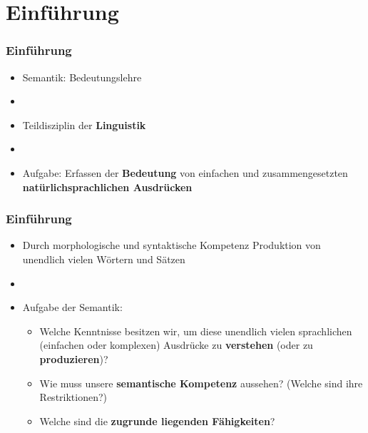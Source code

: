 %
\section{Einführung}
%

\begin{frame}
\frametitle{Einführung}

\begin{itemize}
	\item Semantik: Bedeutungslehre
	\item []
	\item Teildisziplin der \textbf{Linguistik} 
	\item[]
	\item Aufgabe: Erfassen der \textbf{Bedeutung} von einfachen und zusammengesetzten \textbf{natürlichsprachlichen Ausdrücken} 

\end{itemize}

\end{frame}


\begin{frame}
	\frametitle{Einführung}

\begin{itemize}
	\item Durch morphologische und syntaktische Kompetenz \ras Produktion von unendlich vielen Wörtern und Sätzen
	\item[]
	\item Aufgabe der Semantik: 
	
	\begin{itemize}
		\item Welche Kenntnisse besitzen wir, um diese unendlich vielen sprachlichen (einfachen oder komplexen) Ausdrücke zu \textbf{verstehen} (oder zu \textbf{produzieren})?
		
		\item Wie muss unsere \textbf{semantische Kompetenz} aussehen? (Welche sind ihre Restriktionen?)
		
		\item Welche sind die \textbf{zugrunde liegenden Fähigkeiten}?
	\end{itemize}

\end{itemize}

\end{frame}
	
